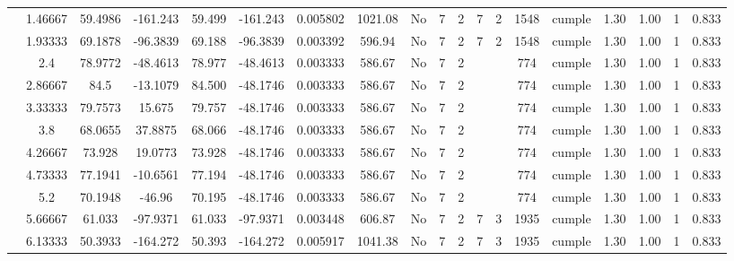 \begin{table}[H]
{\begin{tabular}{|c|c|c|c|c|c|r|c|c|c|c|c|c|c|c|c|c|c|c|}
\cline{2-19}        & 1.46667 & 59.4986 & -161.243 & 59.499 & -161.243 & 0.005802 & 1021.08 & No  & 7   & 2   & 7   & 2   & 1548 & \cellcolor[rgb]{ .776,  .937,  .808}cumple & 1.30 & 1.00 & 1   & 0.833 \bigstrut\\
\cline{2-19}        & 1.93333 & 69.1878 & -96.3839 & 69.188 & -96.3839 & 0.003392 & 596.94 & No  & 7   & 2   & 7   & 2   & 1548 & \cellcolor[rgb]{ .776,  .937,  .808}cumple & 1.30 & 1.00 & 1   & 0.833 \bigstrut\\
\cline{2-19}        & 2.4 & 78.9772 & -48.4613 & 78.977 & -48.4613 & 0.003333 & 586.67 & No  & 7   & 2   &     &     & 774 & \cellcolor[rgb]{ .776,  .937,  .808}cumple & 1.30 & 1.00 & 1   & 0.833 \bigstrut\\
\cline{2-19}        & 2.86667 & 84.5 & -13.1079 & 84.500 & -48.1746 & 0.003333 & 586.67 & No  & 7   & 2   &     &     & 774 & \cellcolor[rgb]{ .776,  .937,  .808}cumple & 1.30 & 1.00 & 1   & 0.833 \bigstrut\\
\cline{2-19}        & 3.33333 & 79.7573 & 15.675 & 79.757 & -48.1746 & 0.003333 & 586.67 & No  & 7   & 2   &     &     & 774 & \cellcolor[rgb]{ .776,  .937,  .808}cumple & 1.30 & 1.00 & 1   & 0.833 \bigstrut\\
\cline{2-19}        & 3.8 & 68.0655 & 37.8875 & 68.066 & -48.1746 & 0.003333 & 586.67 & No  & 7   & 2   &     &     & 774 & \cellcolor[rgb]{ .776,  .937,  .808}cumple & 1.30 & 1.00 & 1   & 0.833 \bigstrut\\
\cline{2-19}        & 4.26667 & 73.928 & 19.0773 & 73.928 & -48.1746 & 0.003333 & 586.67 & No  & 7   & 2   &     &     & 774 & \cellcolor[rgb]{ .776,  .937,  .808}cumple & 1.30 & 1.00 & 1   & 0.833 \bigstrut\\
\cline{2-19}        & 4.73333 & 77.1941 & -10.6561 & 77.194 & -48.1746 & 0.003333 & 586.67 & No  & 7   & 2   &     &     & 774 & \cellcolor[rgb]{ .776,  .937,  .808}cumple & 1.30 & 1.00 & 1   & 0.833 \bigstrut\\
\cline{2-19}        & 5.2 & 70.1948 & -46.96 & 70.195 & -48.1746 & 0.003333 & 586.67 & No  & 7   & 2   &     &     & 774 & \cellcolor[rgb]{ .776,  .937,  .808}cumple & 1.30 & 1.00 & 1   & 0.833 \bigstrut\\
\cline{2-19}        & 5.66667 & 61.033 & -97.9371 & 61.033 & -97.9371 & 0.003448 & 606.87 & No  & 7   & 2   & 7   & 3   & 1935 & \cellcolor[rgb]{ .776,  .937,  .808}cumple & 1.30 & 1.00 & 1   & 0.833 \bigstrut\\
\cline{2-19}        & 6.13333 & 50.3933 & -164.272 & 50.393 & -164.272 & 0.005917 & 1041.38 & No  & 7   & 2   & 7   & 3   & 1935 & \cellcolor[rgb]{ .776,  .937,  .808}cumple & 1.30 & 1.00 & 1   & 0.833 \bigstrut\\

\end{tabular}}
\end{table}
